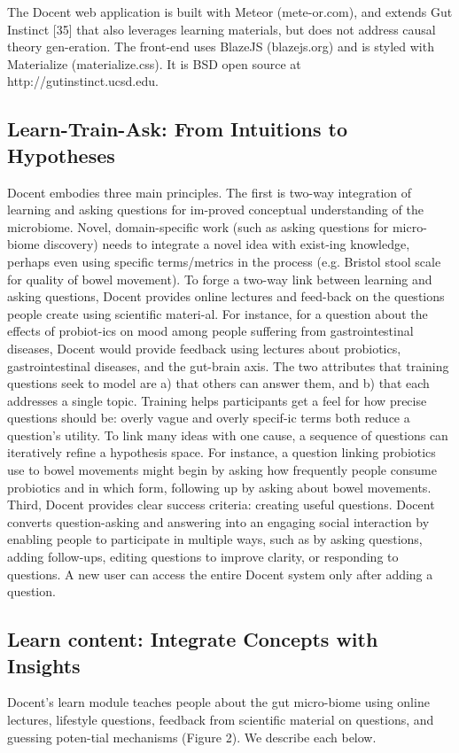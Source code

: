 The Docent web application is built with Meteor (mete-or.com), and extends Gut Instinct [35] that also leverages learning materials, but does not address causal theory gen-eration. The front-end uses BlazeJS (blazejs.org) and is styled with Materialize (materialize.css). It is BSD open source at http://gutinstinct.ucsd.edu.

\subsection{Learn-Train-Ask: From Intuitions to Hypotheses}
Docent embodies three main principles. The first is two-way integration of learning and asking questions for im-proved conceptual understanding of the microbiome. Novel, domain-specific work (such as asking questions for micro-biome discovery) needs to integrate a novel idea with exist-ing knowledge, perhaps even using specific terms/metrics in the process (e.g. Bristol stool scale for quality of bowel movement). To forge a two-way link between learning and asking questions, Docent provides online lectures and feed-back on the questions people create using scientific materi-al. For instance, for a question about the effects of probiot-ics on mood among people suffering from gastrointestinal diseases, Docent would provide feedback using lectures about probiotics, gastrointestinal diseases, and the gut-brain axis.
The two attributes that training questions seek to model are a) that others can answer them, and b) that each addresses a single topic. Training helps participants get a feel for how precise questions should be: overly vague and overly specif-ic terms both reduce a question’s utility. To link many ideas with one cause, a sequence of questions can iteratively refine a hypothesis space. For instance, a question linking probiotics use to bowel movements might begin by asking how frequently people consume probiotics and in which form, following up by asking about bowel movements.
Third, Docent provides clear success criteria: creating useful questions. Docent converts question-asking and answering into an engaging social interaction by enabling people to participate in multiple ways, such as by asking questions, adding follow-ups, editing questions to improve clarity, or responding to questions. A new user can access the entire Docent system only after adding a question. 

\subsection{Learn content: Integrate Concepts with Insights}
Docent’s learn module teaches people about the gut micro-biome using online lectures, lifestyle questions, feedback from scientific material on questions, and guessing poten-tial mechanisms (Figure 2). We describe each below. 

